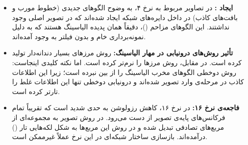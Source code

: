 \begin{itemize}
    \item \textbf{ایجاد :} در تصاویر مربوط به نرخ ۴، به وضوح الگوهای جدیدی (خطوط مورب و بافت‌های کاذب) در داخل دایره‌های شبکه ایجاد شده‌اند که در تصویر اصلی وجود نداشتند. این الگوهای مزاحم ()، دقیقاً همان پدیده الیاسینگ هستند که به دلیل نمونه‌برداری خام و بدون فیلتر به وجود آمده‌اند.
    
    \item \textbf{تأثیر روش‌های درونیابی در مهار الیاسینگ:} روش  مرزهای بسیار دندانه‌دار تولید کرده است. در مقابل، روش  مرزها را نرم‌تر کرده است. اما نکته کلیدی اینجاست: روش دوخطی الگوهای مخرب الیاسینگ را از بین نبرده است؛ زیرا این اطلاعات کاذب در مرحله‌ی  وارد تصویر شده‌اند و درونیابی دوخطی تنها این اطلاعات غلط را تارتر کرده است.
    
    \item \textbf{فاجعه‌ی نرخ ۱۶:} در نرخ ۱۶، کاهش رزولوشن به حدی شدید است که تقریباً تمام فرکانس‌های پایه‌ی تصویر از دست می‌رود. در روش  تصویر به مجموعه‌ای از مربع‌های تصادفی تبدیل شده و در روش  این مربع‌ها به شکل لکه‌هایی تار () درآمده‌اند. بازسازی ساختار شبکه‌ای در این نرخ عملاً غیرممکن است.
\end{itemize}